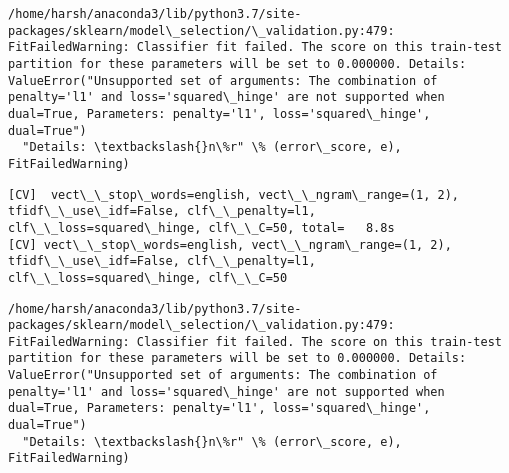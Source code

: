\documentclass[11pt]{article}
\begin{document}
    \begin{Verbatim}[commandchars=\\\{\}]
/home/harsh/anaconda3/lib/python3.7/site-packages/sklearn/model\_selection/\_validation.py:479: FitFailedWarning: Classifier fit failed. The score on this train-test partition for these parameters will be set to 0.000000. Details: 
ValueError("Unsupported set of arguments: The combination of penalty='l1' and loss='squared\_hinge' are not supported when dual=True, Parameters: penalty='l1', loss='squared\_hinge', dual=True")
  "Details: \textbackslash{}n\%r" \% (error\_score, e), FitFailedWarning)

    \end{Verbatim}

    \begin{Verbatim}[commandchars=\\\{\}]
[CV]  vect\_\_stop\_words=english, vect\_\_ngram\_range=(1, 2), tfidf\_\_use\_idf=False, clf\_\_penalty=l1, clf\_\_loss=squared\_hinge, clf\_\_C=50, total=   8.8s
[CV] vect\_\_stop\_words=english, vect\_\_ngram\_range=(1, 2), tfidf\_\_use\_idf=False, clf\_\_penalty=l1, clf\_\_loss=squared\_hinge, clf\_\_C=50 

    \end{Verbatim}

    \begin{Verbatim}[commandchars=\\\{\}]
/home/harsh/anaconda3/lib/python3.7/site-packages/sklearn/model\_selection/\_validation.py:479: FitFailedWarning: Classifier fit failed. The score on this train-test partition for these parameters will be set to 0.000000. Details: 
ValueError("Unsupported set of arguments: The combination of penalty='l1' and loss='squared\_hinge' are not supported when dual=True, Parameters: penalty='l1', loss='squared\_hinge', dual=True")
  "Details: \textbackslash{}n\%r" \% (error\_score, e), FitFailedWarning)

    \end{Verbatim}
\end{document}
